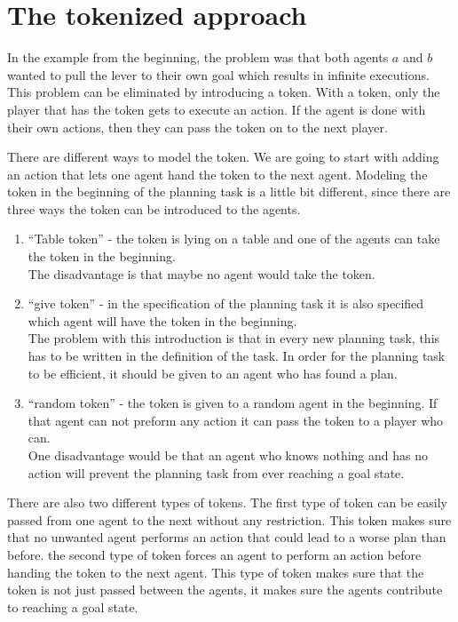 \chapter{The tokenized approach}\label{chap:approach}

In the example from the beginning, the problem was that both agents $a$ and $b$ wanted to pull the lever to their own goal which results in infinite executions. This problem can be eliminated by introducing a token. With a token, only the player that has the token gets to execute an action. If the agent is done with their own actions, then they can pass the token on to the next player.

There are different ways to model the token. We are going to start with adding an action that lets one agent hand the token to the next agent. Modeling the token in the beginning of the planning task is a little bit different, since there are three ways the token can be introduced to the agents.
\begin{enumerate}
  \item ``Table token'' - the token is lying on a table and one of the agents can take the token in the beginning. \\
  The disadvantage is that maybe no agent would take the token.
  \item ``give token'' - in the specification of the planning task it is also specified which agent will have the token in the beginning. \\
  The problem with this introduction is that in every new planning task, this has to be written in the definition of the task. In order for the planning task to be efficient, it should be given to an agent who has found a plan.
  \item ``random token'' - the token is given to a random agent in the beginning. If that agent can not preform any action it can pass the token to a player who can. \\
  One disadvantage would be that an agent who knows nothing and has no action will prevent the planning task from ever reaching a goal state.
\end{enumerate}

There are also two different types of tokens. The first type of token can be easily passed from one agent to the next without any restriction. This token makes sure that no unwanted agent performs an action that could lead to a worse plan than before. the second type of token forces an agent to perform an action before handing the token to the next agent. This type of token makes sure that the token is not just passed between the agents, it makes sure the agents contribute to reaching a goal state.

